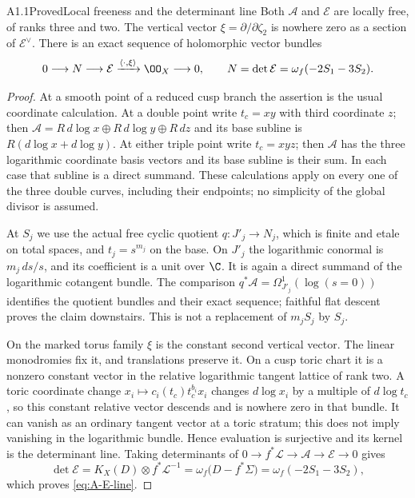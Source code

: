 \begin{claim}{A1.1}{Proved}{Local freeness and the determinant line}
Both $\mathcal A$ and $\mathcal E$ are locally free, of ranks three and
two.  The vertical vector $\xi=\partial/\partial\zeta_2$ is nowhere
zero as a section of $\mathcal E^\vee$.  There is an exact sequence
of holomorphic vector bundles
\begin{equation}\label{eq:A-E-line}
0\longrightarrow N\longrightarrow\mathcal E
 \xrightarrow{\langle\cdot,\xi\rangle}\OO_X\longrightarrow0,
\qquad N=\det\mathcal E=\omega_f(-2S_1-3S_2).
\end{equation}
\end{claim}
\begin{proof}
At a smooth point of a reduced cusp branch the assertion is the usual
coordinate calculation.  At a double point write $t_c=xy$ with third
coordinate $z$; then
$\mathcal A=R\,d\log x\oplus R\,d\log y\oplus R\,dz$ and its
base subline is $R(d\log x+d\log y)$.  At either triple point write
$t_c=xyz$; then $\mathcal A$ has the three logarithmic coordinate
basis vectors and its base subline is their sum.  In each case that
subline is a direct summand.  These calculations apply on every one
of the three double curves, including their endpoints; no simplicity
of the global divisor is assumed.

At $S_j$ we use the actual free cyclic quotient
$q:J'_j\to N_j$, which is finite and etale on total spaces, and
$t_j=s^{m_j}$ on the base.  On $J'_j$ the logarithmic conormal is
$m_j\,ds/s$, and its coefficient is a unit over $\C$.  It is again a
direct summand of the logarithmic cotangent bundle.  The comparison
$q^*\mathcal A=\Omega_{J'_j}^1(\log(s=0))$ identifies the quotient
bundles and their exact sequence; faithful flat descent proves the
claim downstairs.  This is not a replacement of $m_jS_j$ by $S_j$.

On the marked torus family $\xi$ is the constant second vertical
vector.  The linear monodromies fix it, and translations preserve it.
On a cusp toric chart it is a nonzero constant vector in the relative
logarithmic tangent lattice of rank two.  A toric coordinate change
$x_i\mapsto c_i(t_c)t_c^{b_i}x_i$ changes $d\log x_i$ by a multiple
of $d\log t_c$, so this constant relative vector descends and is
nowhere zero in that bundle.  It can vanish as an ordinary tangent
vector at a toric stratum; this does not imply vanishing in the
logarithmic bundle.  Hence evaluation is surjective and its kernel
is the determinant line.  Taking determinants of
$0\to f^*\mathcal L\to\mathcal A\to\mathcal E\to0$ gives
\[
\det\mathcal E=K_X(D)\otimes f^*\mathcal L^{-1}
=\omega_f\bigl(D-f^*\Sigma\bigr)
=\omega_f(-2S_1-3S_2),
\]
which proves \eqref{eq:A-E-line}.
\end{proof}
